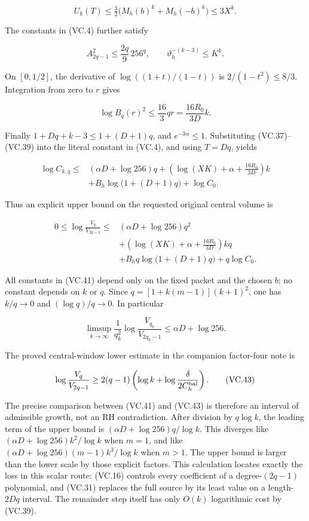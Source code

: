\[
 U_k(T)\le\tfrac32\bigl(M_h(b)^k+M_h(-b)^k\bigr)\le3X^k.
\tag{VC.37}
\]

The constants in (VC.4) further satisfy

\[
 A_{2q-1}^{2}\le\frac{2q}{9}\,256^q,
 \qquad \vartheta_h^{-(k-3)}\le K^k.
\tag{VC.38}
\]

On \([0,1/2]\), the derivative of \(\log((1+t)/(1-t))\) is \(2/(1-t^2)\le8/3\). Integration from zero to \(r\) gives

\[
 \log B_q(r)^2\le\frac{16}{3}qr
                  =\frac{16R_0}{3D}k.
\tag{VC.39}
\]

Finally \(1+Dq+k-3\le1+(D+1)q\), and \(e^{-3\alpha}\le1\). Substituting (VC.37)--(VC.39) into the literal constant in (VC.4), and using \(T=Dq\), yields

\[
\begin{split}
 \log C_{k,q}\le{}& (\alpha D+\log256)q
 +\left(\log(XK)+\alpha+\frac{16R_0}{3D}\right)k\\
 &+B_h\log\bigl(1+(D+1)q\bigr)+\log C_0.
\end{split}
\tag{VC.40}
\]

Thus an explicit upper bound on the requested original central volume is

\[
\boxed{
\begin{split}
 0\le\log\frac{V_q}{V_{2q-1}}\le{}&
 (\alpha D+\log256)q^2\\
 &+\left(\log(XK)+\alpha+\frac{16R_0}{3D}\right)kq\\
 &+B_hq\log\bigl(1+(D+1)q\bigr)+q\log C_0.
\end{split}}
\tag{VC.41}
\]

All constants in (VC.41) depend only on the fixed packet and the chosen \(b\); no constant depends on \(k\) or \(q\). Since \(q=[1+k(m-1)](k+1)^2\), one has \(k/q\to0\) and \((\log q)/q\to0\). In particular

\[
 \limsup_{k\to\infty}\frac{1}{q_k^2}
        \log\frac{V_{q_k}}{V_{2q_k-1}}
 \le\alpha D+\log256.
\tag{VC.42}
\]

The proved central-window lower estimate in the companion factor-four note is

\[
 \log\frac{V_q}{V_{2q-1}}
 \ge2(q-1)\left(\log k+\log\frac{\delta}{2C_h^{\rm bal}}\right).
\tag{VC.43}
\]

The precise comparison between (VC.41) and (VC.43) is therefore an interval of admissible growth, not an RH contradiction. After division by \(q\log k\), the leading term of the upper bound is \((\alpha D+\log256)q/\log k\). This diverges like \((\alpha D+\log256)k^2/\log k\) when \(m=1\), and like \((\alpha D+\log256)(m-1)k^3/\log k\) when \(m>1\). The upper bound is larger than the lower scale by those explicit factors. This calculation locates exactly the loss in this scalar route: (VC.16) controls every coefficient of a degree-\((2q-1)\) polynomial, and (VC.31) replaces the full source by its least value on a length-\(2Dq\) interval. The remainder step itself has only \(O(k)\) logarithmic cost by (VC.39).

